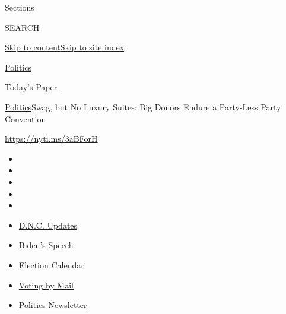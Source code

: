 Sections

SEARCH

\protect\hyperlink{site-content}{Skip to
content}\protect\hyperlink{site-index}{Skip to site index}

\href{https://www.nytimes3xbfgragh.onion/section/politics}{Politics}

\href{https://myaccount.nytimes3xbfgragh.onion/auth/login?response_type=cookie\&client_id=vi}{}

\href{https://www.nytimes3xbfgragh.onion/section/todayspaper}{Today's
Paper}

\href{/section/politics}{Politics}\textbar{}Swag, but No Luxury Suites:
Big Donors Endure a Party-Less Party Convention

\url{https://nyti.ms/3aBForH}

\begin{itemize}
\item
\item
\item
\item
\item
\end{itemize}

\begin{itemize}
\item
  \href{https://www.nytimes3xbfgragh.onion/live/2020/08/20/us/dnc-convention-election?action=click\&pgtype=Article\&state=default\&region=TOP_BANNER\&context=storylines_menu}{D.N.C.
  Updates}
\item
  \href{https://www.nytimes3xbfgragh.onion/2020/08/20/us/politics/biden-presidential-nomination-dnc.html?action=click\&pgtype=Article\&state=default\&region=TOP_BANNER\&context=storylines_menu}{Biden's
  Speech}
\item
  \href{https://www.nytimes3xbfgragh.onion/interactive/2019/us/elections/2020-presidential-election-calendar.html?action=click\&pgtype=Article\&state=default\&region=TOP_BANNER\&context=storylines_menu}{Election
  Calendar}
\item
  \href{https://www.nytimes3xbfgragh.onion/interactive/2020/08/11/us/politics/vote-by-mail-us-states.html?action=click\&pgtype=Article\&state=default\&region=TOP_BANNER\&context=storylines_menu}{Voting
  by Mail}
\item
  \href{https://www.nytimes3xbfgragh.onion/newsletters/politics?action=click\&pgtype=Article\&state=default\&region=TOP_BANNER\&context=storylines_menu}{Politics
  Newsletter}
\end{itemize}

